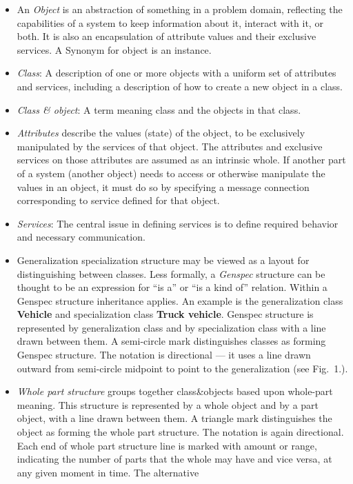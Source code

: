 \documentclass[a4paper]{article}
\newcommand{\class}[1]{{\bf #1}}
\begin{document}
\begin{itemize}
\item
An {\em Object} is an abstraction of something in a problem domain, reflecting
the capabilities of a system to keep information about it, interact
with it, or both. It is also an encapsulation of attribute values and
their exclusive services. A Synonym for object is an instance.
\item
{\em Class}: A description of one or more objects with a uniform set of
attributes and services, including a description of how to create a new
object in a class.
\item
{\em Class \& object}: A term meaning class and the objects in that class. 
\item
{\em Attributes} describe the values (state) of the object, to be
exclusively manipulated by the services of that object. The attributes
and exclusive services on those attributes are assumed as an intrinsic
whole. If another part of a system (another object) needs to access or
otherwise manipulate the values in an object, it must do so by
specifying a message connection corresponding to service defined for
that object.
\item
{\em Services}: The central issue in defining services is to define required
behavior and necessary communication.
\item
Generalization specialization structure may be viewed as a layout for
distinguishing between classes.  Less formally, a {\em Genspec} structure
can be thought to be an expression for ``is a'' or ``is a kind of''
relation. Within a Genspec structure inheritance applies. An example
is the generalization class \class{Vehicle} and specialization class \class{Truck
vehicle}. Genspec structure is represented by generalization class
and by specialization class with a line drawn between them. A
semi-circle mark distinguishes classes as forming Genspec
structure. The notation is directional --- it uses a line drawn outward
from semi-circle midpoint to point to the generalization (see Fig.~1.). 
\item
{\em Whole part structure} groups together class\&objects based upon
whole-part meaning. This structure is represented by a whole object and
by a part object, with a line drawn between them. A triangle mark
distinguishes the object as forming the whole part structure. The notation is
again directional. Each end of whole part structure line is marked
with amount or range, indicating the number of parts that the whole may
have and vice versa, at any given moment in time. The alternative

\end{itemize}
\end{document}
